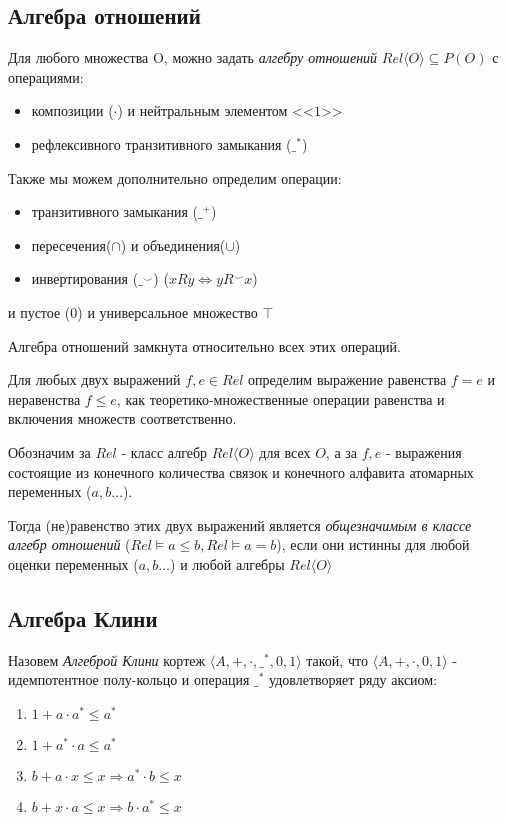 \documentclass[times
              ]{itmo-student-thesis}
\begin{document}
    \subsection{Алгебра отношений}
      Для любого множества O, можно задать \textit{алгебру отношений} $\mathit{Rel}\langle O \rangle \subseteq P(O) $ с операциями:
      \begin{itemize}
        \item композиции ($ \cdot $) и нейтральным элементом <<$1$>>
        \item рефлексивного транзитивного замыкания ($ \_^* $)
      \end{itemize}

      Также мы можем дополнительно определим операции:
      \begin{itemize}
        \item транзитивного замыкания ($ \_^{+} $)
        \item пересечения($ \cap $) и объединения($ \cup $)
        \item инвертирования ($ \_^\smile $) ($ x R y \Leftrightarrow y R^\smile x $)
      \end{itemize}
      и пустое ($0$) и универсальное множество $ \top $

      Алгебра отношений замкнута относительно всех этих операций.

      Для любых двух выражений $ f, e \in \mathit{Rel}$ определим выражение равенства $ f = e $ и неравенства $ f \leq e $, как теоретико-множественные операции равенства и включения множеств соответственно.

      Обозначим за $\mathit{Rel}$ - класс алгебр $ \mathit{Rel}\langle O \rangle $ для всех $ O $,
      а за $ f, e $ - выражения состоящие из конечного количества связок и конечного алфавита атомарных переменных ($ a, b \dots $).

      Тогда (не)равенство этих двух выражений является \textit{общезначимым в классе алгебр отношений}
      ($\mathit{Rel} \models a \leq b, \mathit{Rel} \models a = b $), если они истинны для любой оценки переменных ($a, b \dots $) и любой алгебры $ \mathit{Rel}\langle O \rangle $

    \subsection{Алгебра Клини}

      Назовем \textit{Алгеброй Клини} кортеж $\langle A,+,\cdot,\_^*,0,1\rangle$ такой, что $\langle A, +, \cdot, 0, 1 \rangle$ - идемпотентное полу-кольцо и операция $ \_^* $ удовлетворяет ряду аксиом:
      \begin{enumerate}
        \item $ 1 + a \cdot a^* \leq a^* $
        \item $ 1 + a^* \cdot a \leq a^* $
        \item $ b + a \cdot x \leq x \Rightarrow a^* \cdot b \leq x $
        \item $ b + x \cdot a \leq x \Rightarrow b \cdot a^* \leq x $
      \end{enumerate}
\end{document}
